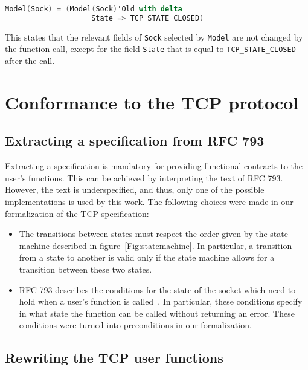 \documentclass[conference]{IEEEtran}
\def\spark#1{\lstinline[language=Ada]{#1}}
\begin{document}
\begin{lstlisting}[language=Ada, basicstyle=\small\ttfamily]
Model(Sock) = (Model(Sock)'Old with delta
                    State => TCP_STATE_CLOSED)
\end{lstlisting}

This states that the relevant fields of \spark{Sock} selected by \spark{Model} are not changed by the function call, except for the field \spark{State} that is equal to \spark{TCP_STATE_CLOSED} after the call.

\section{Conformance to the TCP protocol}
\label{sec:verif}



\subsection{Extracting a specification from RFC 793}

Extracting a specification is mandatory for providing functional contracts to the user's functions. This can be achieved by interpreting the text of RFC 793. However, the text is underspecified, and thus, only one of the possible implementations is used by this work. The following choices were made in our formalization of the TCP specification:

\begin{itemize}
\item The transitions between states must respect the order given by the
state machine described in figure~\ref{Fig:statemachine}. In particular, a transition from a state to another is valid only if the state machine allows for a transition between these two states.
\item RFC 793 describes the conditions for the state of the socket which need to hold when a user's function is called~\cite[p. 52]{rfc793}. In particular, these conditions specify in what state the function can be called without returning an error. These conditions were turned into preconditions in our formalization.
\end{itemize}

\subsection{Rewriting the TCP user functions}
\end{document}
